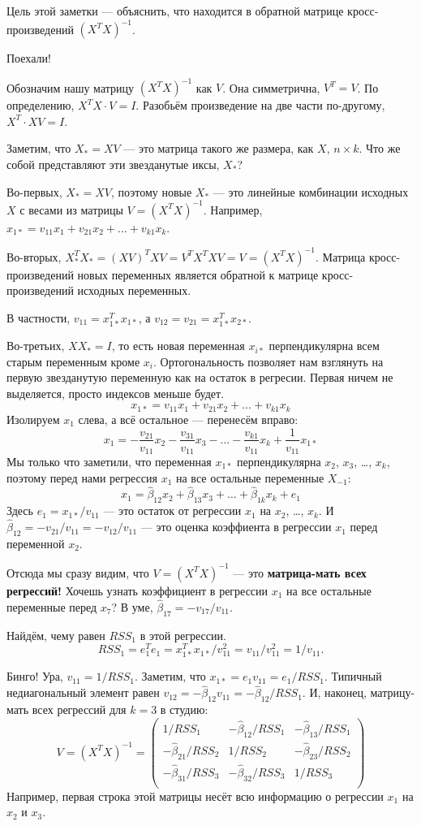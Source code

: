 \documentclass[12pt]{article}
\newcommand{\hb}{\hat{\beta}}
\begin{document}
Цель этой заметки — объяснить, что находится в обратной матрице кросс-произведений $(X^TX)^{-1}$.

Поехали! 

Обозначим нашу матрицу $(X^TX)^{-1}$ как $V$. Она симметрична, $V^T = V$. 
По определению, $X^TX \cdot V = I$.
Разобьём произведение на две части по-другому, $X^T \cdot XV = I$.

Заметим, что $X_* = XV$ — это матрица такого же размера, как $X$, $n\times k$. 
Что же собой представляют эти звезданутые иксы, $X_*$?

Во-первых, $X_* = XV$, поэтому новые $X_*$ — это линейные комбинации исходных $X$ с весами из матрицы $V = (X^TX)^{-1}$.
Например, $x_{1*} = v_{11} x_1 + v_{21} x_2 + \dots + v_{k1} x_k$.

Во-вторых, $X_*^T X_* = (X V)^T   X V = V^T X^TX V = V = (X^TX)^{-1}$. 
Матрица кросс-произведений новых переменных является обратной к матрице кросс-произведений исходных переменных. 

В частности, $v_{11} = x_{1*}^T x_{1*}$, а $v_{12} = v_{21} = x_{1*}^T x_{2*}$.

Во-третьих, $XX_* = I$, то есть новая переменная $x_{i*}$ перпендикулярна всем старым переменным кроме $x_i$.
Ортогональность позволяет нам взглянуть на первую звезданутую переменную как на остаток в регресии.
Первая ничем не выделяется, просто индексов меньше будет.
\[
x_{1*} = v_{11} x_1 + v_{21} x_2 + \dots + v_{k1} x_k 
\]
Изолируем $x_1$ слева, а всё остальное — перенесём вправо:
\[
x_1 = -\frac{v_{21}}{v_{11}} x_2  -\frac{v_{31}}{v_{11}} x_3 - \dots -\frac{v_{k1}}{v_{11}} x_k + \frac{1}{v_{11}} x_{1*} 
\]
Мы только что заметили, что переменная $x_{1*}$ перпендикулярна $x_2$, $x_3$, \dots, $x_k$, поэтому перед нами регрессия $x_1$ на все остальные переменные $X_{-1}$:
\[
x_1 = \hb_{12} x_2 + \hb_{13} x_3 + \dots + \hb_{1k} x_k + e_1
\]
Здесь $e_1 = x_{1*} /v_{11}$ — это остаток от регрессии $x_1$ на $x_2$, \dots, $x_k$.
И $\hb_{12} = -{v_{21}}/{v_{11}} = -{v_{12}}/{v_{11}}$ — это оценка коэффиента в регрессии $x_1$ перед переменной $x_2$.

Отсюда мы сразу видим, что $V = (X^TX)^{-1}$ — это \textbf{матрица-мать всех регрессий!}
Хочешь узнать коэффициент в регрессии $x_1$ на все остальные переменные перед $x_7$?
В уме, $\hb_{17} = - v_{17} / v_{11}$.


Найдём, чему равен $RSS_1$ в этой регрессии.
\[
RSS_1 = e_1^T e_1 = x_{1*}^T x_{1*} / v_{11}^2  = v_{11} / v_{11}^2 = 1  / v_{11}.
\]

Бинго! Ура, $v_{11} = 1/ RSS_1$. 
Заметим, что $x_{1*} = e_1 v_{11} = e_1/RSS_1$.
Типичный недиагональный элемент равен $v_{12} = -\hb_{12} v_{11} = -\hb_{12}/RSS_1$.
И, наконец, матрицу-мать всех регрессий для $k=3$ в студию:
\[
V = (X^TX)^{-1} = \begin{pmatrix}
    1/RSS_1 & -{\hb_{12}}/{RSS_1} & -{\hb_{13}}/{RSS_1}\\
    - {\hb_{21}}/{RSS_2} & 1/RSS_2 & - {\hb_{23}}/{RSS_2} \\
    - {\hb_{31}}/{RSS_3}  & - {\hb_{32}}/{RSS_3} & 1/RSS_3 \\
\end{pmatrix} 
\]
Например, первая строка этой матрицы несёт всю информацию о регрессии $x_1$ на $x_2$ и $x_3$.
\end{document}
